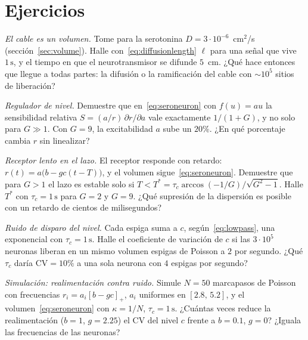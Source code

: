 \section{Ejercicios}

\begin{exercise}[\lvlA]
\label{ex:05:1}
\emph{El cable es un volumen.} Tome para la serotonina $D=3\cdot10^{-6}$~cm$^2$/s (sección~\ref{sec:volume}). Halle con~\eqref{eq:diffusionlength} $\ell$ para una señal que vive $1\,\text{s}$, y el tiempo en que el neurotransmisor se difunde $5$~cm. ¿Qué hace entonces que  llegue a todas partes: la difusión o la ramificación del cable con $\sim10^5$ sitios de liberación?
\end{exercise}

\begin{exercise}[\lvlA]
\label{ex:05:2}
\emph{Regulador de nivel.} Demuestre que en~\eqref{eq:seroneuron} con $f(u)=au$ la sensibilidad relativa $S=(a/r)\,\partial r/\partial a$ vale exactamente $1/(1+G)$, y no solo para $G\gg1$. Con $G=9$, la excitabilidad $a$ sube un $20\%$. ¿En qué porcentaje cambia $r$ sin linealizar?
\end{exercise}

\begin{exercise}[\lvlB]
\label{ex:05:3}
\emph{Receptor lento en el lazo.} El receptor  responde con retardo: $r(t)=a\bigl(b-gc(t-T)\bigr)$, y el volumen sigue~\eqref{eq:seroneuron}. Demuestre que para $G>1$ el lazo es estable solo si $T<T^*=\tau_c\arccos(-1/G)/\sqrt{G^2-1}$. Halle $T^*$ con $\tau_c=1\,\text{s}$ para $G=2$ y $G=9$. ¿Qué supresión de la dispersión es posible con un retardo de cientos de milisegundos?
\end{exercise}

\begin{exercise}[\lvlB]
\label{ex:05:4}
\emph{Ruido de disparo del nivel.} Cada espiga suma a $c$, según~\eqref{eq:lowpass}, una exponencial con $\tau_c=1\,\text{s}$. Halle el coeficiente de variación de $c$ si las $3\cdot10^5$ neuronas  liberan en un mismo volumen espigas de Poisson a $2$ por segundo. ¿Qué $\tau_c$ daría $\mathrm{CV}=10\%$ a una sola neurona con $4$ espigas por segundo?
\end{exercise}

\begin{exercise}[\lvlB]
\label{ex:05:5}
\emph{Simulación: realimentación contra ruido.} Simule $N=50$ marcapasos de Poisson con frecuencias $r_i=a_i[b-gc]_+$, $a_i$ uniformes en $[2.8,\,5.2]$, y el volumen~\eqref{eq:seroneuron} con $\kappa=1/N$, $\tau_c=1\,\text{s}$. ¿Cuántas veces reduce la realimentación ($b=1$, $g=2.25$) el CV del nivel $c$ frente a $b=0.1$, $g=0$? ¿Iguala las frecuencias de las neuronas?
\end{exercise}

